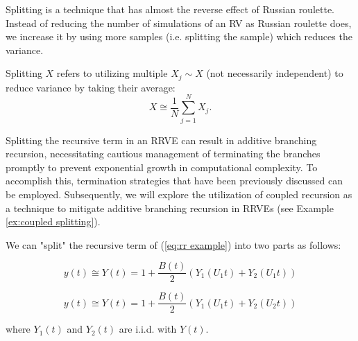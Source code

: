 \documentclass[a4paper,12pt]{article}
\begin{document}



Splitting is a technique that has almost the reverse effect of Russian roulette.
Instead of reducing the number of simulations of an RV as Russian roulette does,
we increase it by using more samples (i.e. splitting the sample) which
reduces the variance.

\begin{definition}[splitting] \label{def:splitting}
    Splitting $X$ refers to utilizing multiple $X_{j} \sim X$ (not necessarily independent) to
    reduce variance by taking their average:
    \begin{equation}
        X \cong \frac{1}{N} \sum_{j=1}^{N} X_{j}.
    \end{equation}
\end{definition}

Splitting the recursive term in an RRVE can result in additive branching recursion,
necessitating cautious management of terminating the branches promptly to prevent
exponential growth in computational complexity. To accomplish this, termination
strategies that have been previously discussed can be employed. Subsequently,
we will explore the utilization of coupled recursion as a technique to mitigate
additive branching recursion in RRVEs (see Example \ref{ex:coupled splitting}).

\begin{example} \label{ex:splitting}
    We can "split" the recursive term of (\ref{eq:rr example})
    into two parts as follows:

    \begin{equation}\label{eq:splitting}
        y(t) \cong Y(t) =1 + \frac{B(t)}{2}(Y_{1}(U_{1}t) + Y_{2}(U_{1}t))
    \end{equation}


    \begin{equation}\label{eq:splitting2}
        y(t) \cong Y(t) =1 + \frac{B(t)}{2}(Y_{1}(U_{1}t) + Y_{2}(U_{2}t))
    \end{equation}


    where $Y_{1}(t)$ and $Y_{2}(t)$ are i.i.d. with $Y(t)$.
\end{example}
\end{document}
